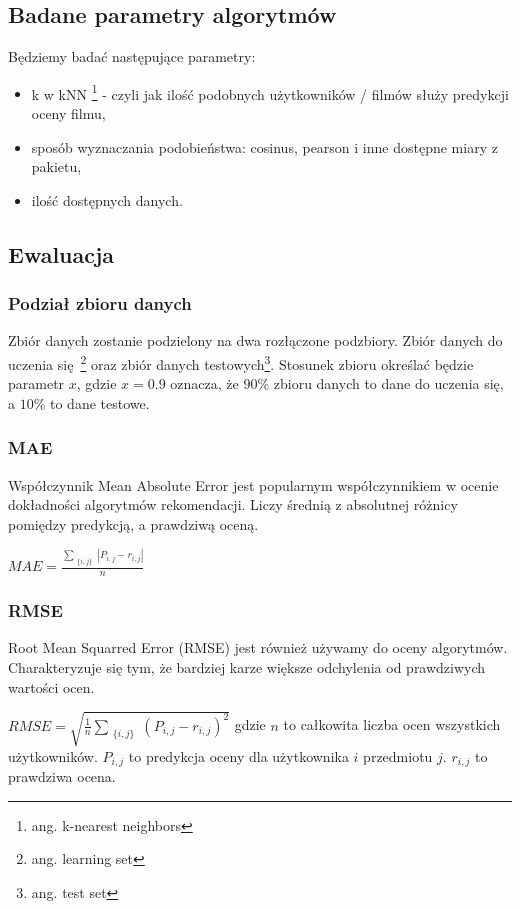 \documentclass[12pt, a4paper]{article}
\begin{document}
\subsection{Badane parametry algorytmów}
Będziemy badać następujące parametry:
\begin{itemize}
\item k w kNN \footnote{ang. k-nearest neighbors} - czyli jak ilość podobnych użytkowników / filmów służy predykcji oceny filmu,
\item sposób wyznaczania podobieństwa: cosinus, pearson i inne dostępne miary z pakietu,
\item ilość dostępnych danych.
\end{itemize}


\subsection{Ewaluacja}

\subsubsection{Podział zbioru danych}
Zbiór danych zostanie podzielony na dwa rozłączone podzbiory. Zbiór danych do uczenia się\
\footnote{ang. learning set} oraz zbiór danych testowych\footnote{ang. test set}. Stosunek
zbioru określać będzie parametr $x$, gdzie $x = 0.9$ oznacza, że $90\%$ zbioru danych to
dane do uczenia się, a $10\%$ to dane testowe.

\subsubsection{MAE}
Współczynnik Mean Absolute Error jest popularnym współczynnikiem w ocenie dokładności
algorytmów rekomendacji. Liczy średnią z absolutnej różnicy pomiędzy predykcją, a prawdziwą
oceną.

\begin{math}
MAE = \frac{
        \sum_{\substack{
   \{i, j\}
  }}
  |P_{i,j} - r_{i,j}|
}{n}
\end{math}

\subsubsection{RMSE}
Root Mean Squarred Error (RMSE) jest również używamy do oceny algorytmów. Charakteryzuje
się tym, że bardziej karze większe odchylenia od prawdziwych wartości ocen.

\begin{math}
RMSE = \sqrt{
        \frac{1}{n} \sum_{ \substack{
                \{i,j\}
        } }
        (P_{i,j} - r_{i,j})^2
}
\end{math}
gdzie $n$ to całkowita liczba ocen wszystkich użytkowników. $P_{i,j}$ to predykcja oceny
dla użytkownika $i$ przedmiotu $j$. $r_{i,j}$ to prawdziwa ocena.
\end{document}
